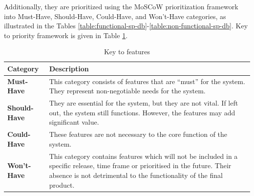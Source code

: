  Additionally, they are prioritized using the MoSCoW prioritization framework into Must-Have, Should-Have, Could-Have, and Won’t-Have categories, as illustrated in the Tables \ref{table:functional-sp-db}-\ref{table:non-functional-sp-db}. Key to priority framework is given in Table \ref{tab:key-to-features}.
 

 \begin{table}[h!]
        \centering
        \begin{tabularx}{\textwidth}{|p{3cm}|X|}
            \hline
             \textbf{Category} 
             & \textbf{Description} \\ \hline

             \textbf{Must-Have} 
             & This category consists of features that are “must” for the system. They represent non-negotiable needs for the system.  
             \\ \hline

             \textbf{Should-Have} 
             & 	They are essential for the system, but they are not vital. If left out, the system still functions. However, the features  may add significant value. 
             \\ \hline

             \textbf{Could-Have} 
             & These features are not necessary to the core function of the system. 
             \\ \hline

             \textbf{Won't-Have} 
             & This category contains features which will not be included in a specific release, time frame or prioritised in the future. Their absence is not detrimental to the functionality of the final product.
             \\ \hline 
        \end{tabularx}
        \caption{Key to features}
        \label{tab:key-to-features}
    \end{table} 


    
\clearpage

